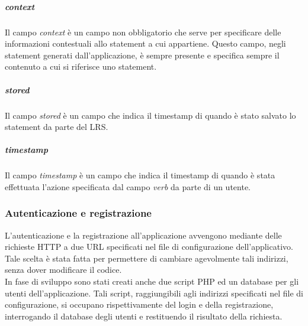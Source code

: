 \documentclass[../Tesi.tex]{subfiles}
\begin{document}
					\subparagraph{context}
					Il campo \textit{context} è un campo non obbligatorio che serve per specificare delle informazioni contestuali allo statement a cui appartiene. Questo campo, negli statement generati dall'applicazione, è sempre presente e specifica sempre il contenuto a cui si riferisce uno statement.

					\subparagraph{stored}
					Il campo \textit{stored} è un campo che indica il timestamp di quando è stato salvato lo statement da parte del LRS.

					\subparagraph{timestamp}
					Il campo \textit{timestamp} è un campo che indica il timestamp di quando è stata effettuata l'azione specificata dal campo \textit{verb} da parte di un utente.

			\subsubsection{Autenticazione e registrazione}
			L'autenticazione e la registrazione all'applicazione avvengono mediante delle richieste HTTP a due URL specificati nel file di configurazione dell'applicativo. Tale scelta è stata fatta per permettere di cambiare agevolmente tali indirizzi, senza dover modificare il codice. \\In fase di sviluppo sono stati creati anche due script PHP ed un database per gli utenti dell'applicazione. Tali script, raggiungibili agli indirizzi specificati nel file di configurazione, si occupano rispettivamente del login e della registrazione, interrogando il database degli utenti e restituendo il risultato della richiesta.
\end{document}
